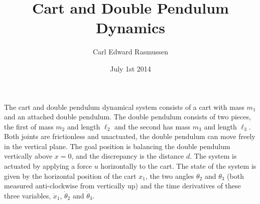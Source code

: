 \documentclass{article}
\title{Cart and Double Pendulum Dynamics}
\author{Carl Edward Rasmussen}
\date{July 1st 2014}
\begin{document}
\maketitle

The cart and double pendulum dynamical system consists of a cart with
mass $m_1$ and an attached double pendulum. The double pendulum
consists of two pieces, the first of mass $m_2$ and length $\ell_2$
and the second has mass $m_3$ and length $\ell_3$. Both joints are
frictionless and unactuated, the double pendulum can move freely in the
vertical plane. The goal position is balancing the double pendulum vertically
above $x=0$, and the discrepancy is the distance $d$. The system is
actuated by applying a force $u$ horizontally to the cart. The state
of the system is given by the horizontal position of the cart $x_1$,
the two angles $\theta_2$ and $\theta_3$ (both measured anti-clockwise from
vertically up) and the time derivatives of these three variables,
$\dot x_1$, $\dot\theta_2$ and $\dot\theta_3$.
\end{document}
